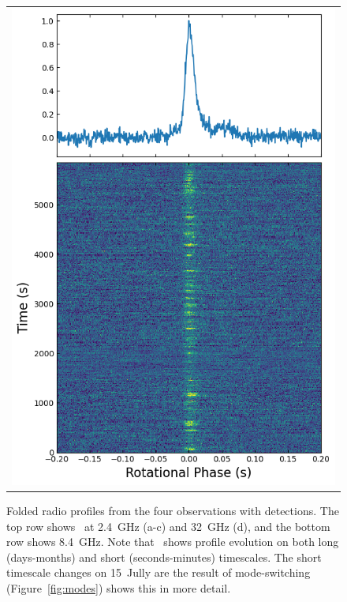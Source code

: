 \documentclass[twocolumn]{emulateapj}
\begin{document}
\begin{figure}[b]
\begin{tabular}[b]{@{}p{}@{}}
	\includegraphics[width=\linewidth]{plots/x-band_Aug10.png}
    \end{tabular}
    \quad 

    \caption{Folded radio profiles from the four observations with 
             detections.  The top row shows \jmag\ at 2.4~GHz (a-c) 
             and 32~GHz (d), and the bottom row shows 8.4~GHz.  Note 
             that \jmag\ shows profile evolution on both long (days-months) 
             and short (seconds-minutes) timescales.  The short timescale 
             changes on 15~Jully are the result of mode-switching 
             (Figure~\ref{fig:modes}) shows this in more detail.
            }
	\label{fig:radio_profs}
\end{figure}
\end{document}
